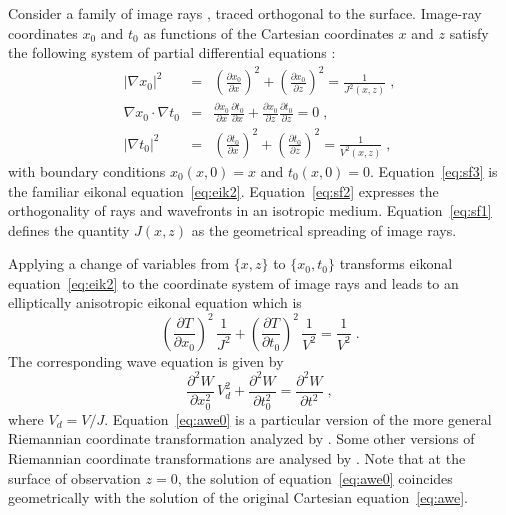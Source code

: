 Consider a family of image rays \cite[]{hubral1977time}, traced
orthogonal to the surface. Image-ray coordinates $x_0$ and $t_0$ as
functions of the Cartesian coordinates $x$ and $z$ satisfy the
following system of partial differential equations :
\begin {eqnarray}
  |\nabla x_0|^2&=&\left(\frac{\partial x_0}{\partial x}\right)^2+\left(\frac{\partial x_0}{\partial z}\right)^2
  =\frac{1}{J^2(x,z)}\;, \label{eq:sf1} \\
  \nabla x_0\cdot\nabla t_0&=&\frac{\partial x_0}{\partial x}\frac{\partial t_0}{\partial x}+
\frac{\partial x_0}{\partial z}\frac{\partial t_0}{\partial z}=0\;, \label{eq:sf2} \\
|\nabla t_0|^2&=&\left(\frac{\partial t_0}{\partial x}\right)^2+\left(\frac{\partial t_0}{\partial z}\right)^2
=\frac{1}{V^2(x,z)}\;, \label{eq:sf3} 
\end{eqnarray}
with boundary conditions $x_0(x,0)=x$ and
$t_0(x,0)=0$. Equation~\ref{eq:sf3} is the familiar eikonal
equation~\ref{eq:eik2}. Equation~\ref{eq:sf2} expresses the
orthogonality of rays and wavefronts in an isotropic
medium. Equation~\ref{eq:sf1} defines the quantity $J(x,z)$ as the
geometrical spreading of image rays.

Applying a change of variables from $\{x,z\}$ to $\{x_0,t_0\}$ 
transforms eikonal equation~\ref{eq:eik2} to the
coordinate system of image rays and leads to an
elliptically anisotropic eikonal equation which is
\begin{equation}
\label{eq:eik0}
\left(\frac{\partial T}{\partial x_0}\right)^2\,\frac{1}{J^2} + \left(\frac{\partial T}{\partial t_0}\right)^2\,\frac{1}{V^2} = \frac{1}{V^2}\;.
\end{equation}
The corresponding wave equation is given by
\begin{equation}
\label{eq:awe0}
\frac{\partial^2 W}{\partial x_0^2}\,V_d^2 + \frac{\partial^2 W}{\partial t_0^2} = \frac{\partial^2 W}{\partial t^2}\;,
\end{equation}
where $V_d=V/J$. Equation~\ref{eq:awe0} is a particular version of
the more general Riemannian coordinate transformation analyzed
by \cite{sava2005riemannian}. Some other versions of Riemannian coordinate transformations are analysed by \cite{shragge2008riemannian,shragge2008prestack}. Note that at the surface of observation
$z=0$, the solution of equation~\ref{eq:awe0} coincides
geometrically with the solution of the original Cartesian
equation~\ref{eq:awe}.

